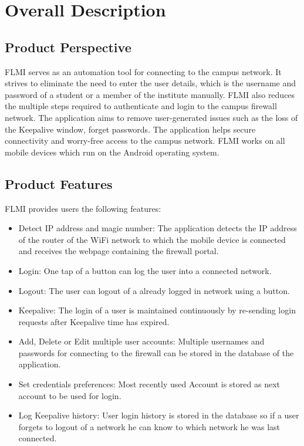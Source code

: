 \chapter{Overall Description}
\label{Overall Description}

\section{Product Perspective}
FLMI serves as an automation tool for connecting to the campus network. It strives to eliminate the need to enter the user details, which is the username and password of a student or a member of the institute manually. FLMI also reduces the multiple steps required to authenticate and login to the campus firewall network. The application aims to remove user-generated issues such as the loss of the Keepalive window, forget passwords.
The application helps secure connectivity and worry-free access to the campus network. FLMI works on all mobile devices which run on the Android operating system.

\section{Product Features}
FLMI provides users the following features:
\begin{itemize}
    \item Detect IP address and magic number: The application detects the IP address of the router of the WiFi network to which the mobile device is connected and receives the webpage containing the firewall portal. 
    \item Login: One tap of a button can log the user into a connected network. 
    \item Logout: The user can logout of a already logged in network using a button.
    \item Keepalive: The login of a user is maintained continuously by re-sending login requests after Keepalive time has expired. 
    \item Add, Delete or Edit multiple user accounts: Multiple usernames and passwords for connecting to the firewall can be stored in the database of the application.
    \item Set credentials preferences: Most recently used Account is stored as next account to be used for login.
    \item Log Keepalive history: User login history is stored in the database so if a user forgets to logout of a network he can know to which network he was last connected.
\end{itemize}

